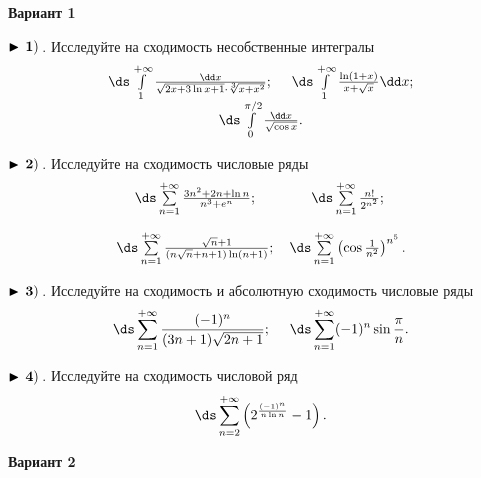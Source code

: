 
\centerline{\bf\Large Вариант 1}


$\bf\blacktriangleright\,1)\,$. Исследуйте на сходимость несобственные интегралы
\begin{equation*}
\begin{array}{cc}
  \,\ds\int\limits_{1}^{+\infty} \frac{\dd x}{\sqrt{2x+3\ln x +1}\cdot\sqrt[3]{x+x^2}}

  ;\quad\,    \,
\ds\int\limits_{1}^{+\infty}\frac{\ln(1+x)}{x+\sqrt{x}}\dd x

  ;\\
  \,
\ds\int\limits_{0}^{\pi/2}\frac{\dd x}{\sqrt{\cos x}}

  .
\end{array}
\end{equation*}


$\bf\blacktriangleright\,2)\,$. Исследуйте на сходимость числовые ряды
\begin{equation*}
    \begin{array}{ccc}
        \,
\ds\sum\limits_{n=1}^{+\infty}\frac{3n^2+2n+\ln n}{n^3+e^n}

        ; &   \,
\ds\sum\limits_{n=1}^{+\infty}\frac{n!}{2^{n^2}}

        ; \\[6mm]
        \,
\ds\sum\limits_{n=1}^{+\infty}\frac{\sqrt{n}+1}{(n\sqrt{n}+n+1)\ln (n+1)}

        ; &    \,
\ds\sum\limits_{n=1}^{+\infty}\left(\cos\frac{1}{n^2}\right)^{n^5}

        .
    \end{array}
\end{equation*}


$\bf\blacktriangleright\,3)\,$. Исследуйте на сходимость и абсолютную сходимость числовые ряды
\begin{equation*}
    \,
\ds\sum\limits_{n=1}^{+\infty}\frac{(-1)^n}{(3n+1)\sqrt{2n+1}}

    ;\quad\,   \,
\ds\sum\limits_{n=1}^{+\infty}(-1)^n\sin\frac{\pi}{n}

    .
\end{equation*}


$\bf\blacktriangleright\,4)\,$. Исследуйте на сходимость числовой ряд
\begin{equation*}
    \,\ds\sum\limits_{n=2}^{+\infty}\left(2^{\frac{(-1)^n}{n\ln n}}-1\right)

    .
\end{equation*}

\centerline{\bf\Large Вариант 2}


